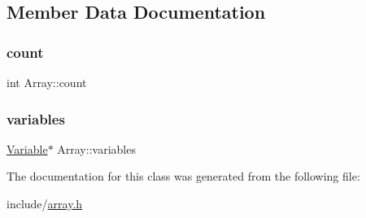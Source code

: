 \subsection{Member Data Documentation}
\mbox{\label{classArray_a11dfcc73b3484e2bfdb5ce81457a7650}} 
\subsubsection{\texorpdfstring{count}{count}}
{\footnotesize\ttfamily int Array\+::count}

\mbox{\label{classArray_af685a2298bef03e179093d6791c75b40}} 
\subsubsection{\texorpdfstring{variables}{variables}}
{\footnotesize\ttfamily \hyperlink{classVariable}{Variable}$\ast$ Array\+::variables}



The documentation for this class was generated from the following file\+:\begin{DoxyCompactItemize}
\item 
include/\hyperlink{array_8h}{array.\+h}\end{DoxyCompactItemize}
